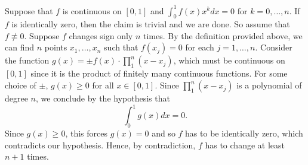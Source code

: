 \documentclass{article}
\begin{document}
\begin{solutions}
	Suppose that $f$ is continuous on $[0,1]$ and $\int_{0}^{1}f(x)x^{k}dx = 0$ for $k =0, \ldots, n$. If $f$ is identically zero, then the claim is trivial and we are done. So assume that $f \nequiv 0$. Suppose $f$ changes sign only $n$ times. By the definition provided above, we can find $n$ points $x_{1}, \ldots, x_{n}$ such that $f(x_{j}) = 0$ for each $j = 1, \ldots, n$. Consider the function $g(x) = \pm f(x) \cdot \prod_{1}^{n}(x - x_{j})$, which must be continuous on $[0,1]$ since it is the product of finitely many continuous functions. For some choice of $\pm$, $g(x) \geq 0$ for all $x \in [0,1]$. Since $\prod_{1}^{n}(x - x_{j})$ is a polynomial of degree $n$, we conclude by the hypothesis that 
		\begin{equation}
			\int_{0}^{1}g(x)dx = 0. 
		\end{equation}
	Since $g(x) \geq 0$, this forces $g(x) =0$ and so $f$ has to be identically zero, which contradicts our hypothesis. Hence, by contradiction, $f$ has to change at least $n + 1$ times. 
\end{solutions}
\end{document}
